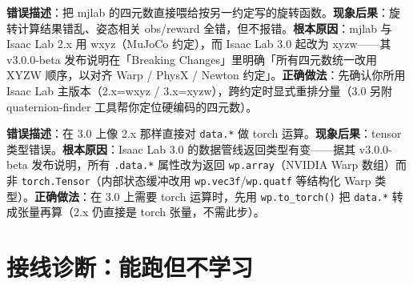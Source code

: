 \begin{pitfall}[假设两框架四元数格式相同]
\textbf{错误描述}：把 mjlab 的四元数直接喂给按另一约定写的旋转函数。\textbf{现象后果}：旋转计算结果错乱、姿态相关 obs/reward 全错，但不报错。\textbf{根本原因}：mjlab 与 Isaac Lab 2.x 用 wxyz（MuJoCo 约定），而 Isaac Lab 3.0 起改为 xyzw——其 v3.0.0-beta 发布说明在「Breaking Changes」里明确「所有四元数统一改用 XYZW 顺序，以对齐 Warp / PhysX / Newton 约定」。\textbf{正确做法}：先确认你所用 Isaac Lab 主版本（2.x=wxyz / 3.x=xyzw），跨约定时显式重排分量（3.0 另附 quaternion-finder 工具帮你定位硬编码的四元数）。
\end{pitfall}

\begin{pitfall}
\textbf{错误描述}：在 3.0 上像 2.x 那样直接对 \verb|data.*| 做 torch 运算。\textbf{现象后果}：tensor 类型错误。\textbf{根本原因}：Isaac Lab 3.0 的数据管线返回类型有变——据其 v3.0.0-beta 发布说明，所有 \texttt{.data.*} 属性改为返回 \texttt{wp.array}（NVIDIA Warp 数组）而非 \texttt{torch.\allowbreak Tensor}（内部状态缓冲改用 \texttt{wp.vec3f}/\allowbreak\texttt{wp.quatf} 等结构化 Warp 类型）。\textbf{正确做法}：在 3.0 上需要 torch 运算时，先用 \texttt{wp.\allowbreak to\_torch()} 把 \texttt{data.*} 转成张量再算（2.x 仍直接是 torch 张量，不需此步）。
\end{pitfall}

\begin{practice}[本节练习]
\end{practice}

\section{接线诊断：能跑但不学习}
\label{sec:rlmc-mgr-debug}

